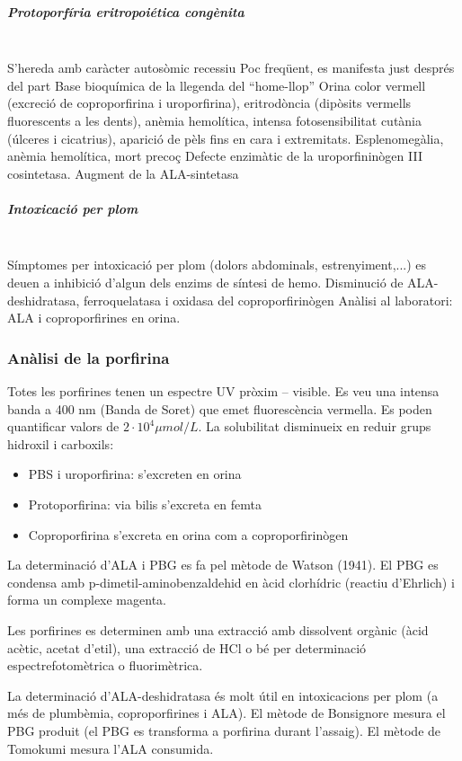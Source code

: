 \begin{itemize}
\subparagraph{Protoporfíria eritropoiética congènita} \hfill \\
S’hereda amb caràcter autosòmic recessiu
Poc freqüent, es manifesta just després del part
Base bioquímica de la llegenda del ``home-llop''
Orina color vermell (excreció de coproporfirina i uroporfirina), eritrodòncia (dipòsits vermells fluorescents a les dents), anèmia hemolítica, intensa fotosensibilitat cutània (úlceres i cicatrius), aparició de pèls fins en cara i extremitats.
Esplenomegàlia, anèmia hemolítica, mort precoç
Defecte enzimàtic de la uroporfininògen III cosintetasa. Augment de la ALA-sintetasa

\subparagraph{Intoxicació per plom} \hfill \\
 Símptomes per intoxicació per plom (dolors abdominals, estrenyiment,...) es deuen a inhibició d’algun dels enzims de síntesi de hemo.
Disminució de ALA-deshidratasa, ferroquelatasa i oxidasa del coproporfirinògen
Anàlisi al laboratori: ALA  i coproporfirines en orina.

\subsubsection*{Anàlisi de la porfirina}
Totes les porfirines tenen un espectre UV pròxim – visible. Es veu una intensa banda a 400 nm (Banda de Soret) que emet fluorescència vermella. Es poden quantificar valors de $2\cdot 10^4 \mu mol/L$. La solubilitat disminueix en reduir grups hidroxil i carboxils:
\begin{itemize}
\item PBS i uroporfirina: s’excreten en orina
\item Protoporfirina: via bilis   s’excreta en femta
\item Coproporfirina s’excreta en orina com a coproporfirinògen
\end{itemize}

La determinació d'ALA i PBG es fa pel mètode de Watson (1941). El PBG es condensa amb p-dimetil-aminobenzaldehid en àcid clorhídric (reactiu d’Ehrlich) i forma un complexe magenta.

Les porfirines es determinen amb una extracció amb dissolvent orgànic (àcid acètic, acetat d’etil), una extracció de HCl o bé per determinació espectrefotomètrica o fluorimètrica.

La determinació d'ALA-deshidratasa és molt útil en intoxicacions per plom (a més de plumbèmia, coproporfirines i ALA). El mètode de Bonsignore mesura el PBG produit (el PBG es transforma a porfirina durant l’assaig). El mètode de Tomokumi mesura l'ALA consumida.


\end{itemize}
